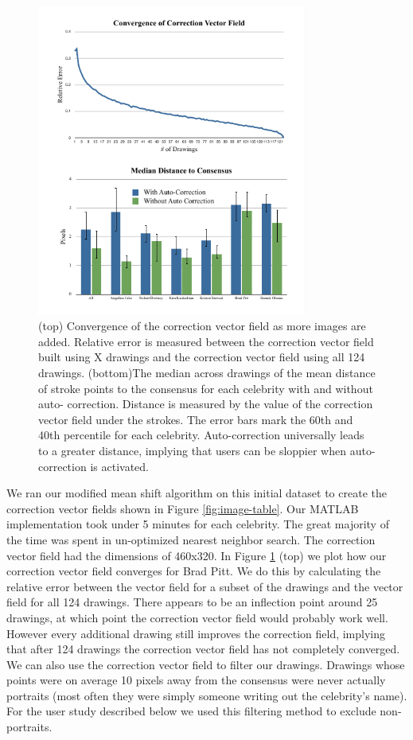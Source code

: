 \begin{figure}[!t]
  \centering%
\includegraphics[width=3.5in]{./figures/userstudy/twoGraph.pdf}
  \caption{(top) Convergence of the correction vector field as more images are added. Relative error is measured between
the correction vector field built using X drawings and the correction vector field using all 124 drawings. (bottom)The
median across drawings of the mean distance of stroke points to the consensus for each celebrity with and without auto-
correction. Distance is measured by the value of the correction vector field under the strokes. The error bars mark the
60th and 40th percentile for each celebrity. Auto-correction universally leads to a greater distance, implying that users
can be sloppier when auto-correction is activated.}
  \label{fig:daf-two}
\end{figure}



We ran our modified mean shift algorithm on this initial dataset to create the correction vector fields shown in Figure \ref{fig:image-table}. Our MATLAB implementation took under 5 minutes for each celebrity.  The great majority of the time was spent in un-optimized nearest neighbor search. The correction vector field had the dimensions of 460x320. In Figure \ref{fig:daf-two} (top) we plot how our correction vector field converges for Brad Pitt. We do this by calculating the relative error between the vector field for a subset of the drawings and the vector field for all 124 drawings. There appears to be an inflection point around 25 drawings, at which point the correction vector field would probably work well. However every additional drawing still improves the correction field, implying that after 124 drawings the correction vector field has not completely converged. We can also use the correction vector field to filter our drawings. Drawings whose points were on average 10 pixels away from the consensus were never actually portraits (most often they were simply someone writing out the celebrity's name). For the user study described below we used this filtering method to exclude non-portraits. 


